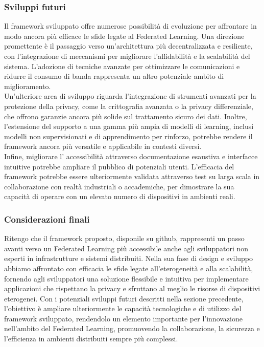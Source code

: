 \documentclass[a4paper, oneside, openright]{report}
\makeatletter
\newcommand\footnoteref[1]{\protected@xdef\@thefnmark{\ref{#1}}\@footnotemark}
\makeatother
\begin{document}
\subsubsection*{Sviluppi futuri}
Il framework\footnoteref{nt:framework} sviluppato offre numerose possibilità di evoluzione per affrontare in modo ancora più efficace le sfide legate al Federated Learning. Una direzione promettente è il passaggio verso un'architettura più decentralizzata e resiliente, con l'integrazione di meccanismi per migliorare l'affidabilità e la scalabilità del sistema. L'adozione di tecniche avanzate per ottimizzare le comunicazioni e ridurre il consumo di banda rappresenta un altro potenziale ambito di miglioramento.\\
Un'ulteriore area di sviluppo riguarda l'integrazione di strumenti avanzati per la protezione della privacy, come la crittografia avanzata o la privacy differenziale, che offrono garanzie ancora più solide sul trattamento sicuro dei dati. Inoltre, l'estensione del supporto a una gamma più ampia di modelli di learning, inclusi modelli non supervisionati e di apprendimento per rinforzo, potrebbe rendere il framework\footnoteref{nt:framework} ancora più versatile e applicabile in contesti diversi.\\
Infine, migliorare l’ accessibilità attraverso documentazione esaustiva e interfacce intuitive potrebbe ampliare il pubblico di potenziali utenti. L'efficacia del framework\footnoteref{nt:framework} potrebbe essere ulteriormente validata attraverso test su larga scala in collaborazione con realtà industriali o accademiche, per dimostrare la sua capacità di operare con un elevato numero di dispositivi in ambienti reali.

\subsubsection*{Considerazioni finali}
Ritengo che il framework proposto, disponile su github\footnoteref{nt:framework}, rappresenti un passo avanti verso un Federated Learning più accessibile anche agli sviluppatori non esperti in infrastrutture e sistemi distribuiti. Nella sua fase di design e sviluppo abbiamo affrontato con efficacia le sfide legate all'eterogeneità e alla scalabilità, fornendo agli sviluppatori una soluzione flessibile e intuitiva per implementare applicazioni che rispettano la privacy e sfruttano al meglio le risorse di dispositivi eterogenei. Con i potenziali sviluppi futuri descritti nella sezione precedente, l'obiettivo è ampliare ulteriormente le capacità tecnologiche e di utilizzo del framework sviluppato, rendendolo un elemento importante per l'innovazione nell'ambito del Federated Learning, promuovendo la collaborazione, la sicurezza e l'efficienza in ambienti distribuiti sempre più complessi.
\clearpage{}




\clearpage{}\clearpage{}
\end{document}
